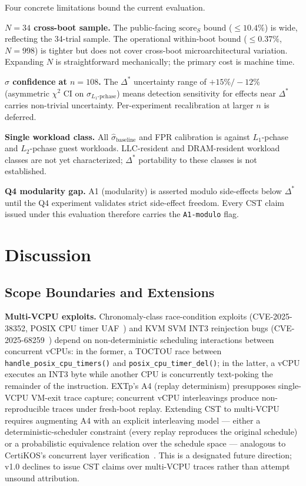 \documentclass[conference]{IEEEtran}
\newcommand{\sigbase}{\hat{\sigma}_\text{baseline}}
\newcommand{\Dstar}{\Delta^{*}}
\newcommand{\scoreS}{\text{score}_S}
\begin{document}
Four concrete limitations bound the current evaluation.

\textbf{$N{=}34$ cross-boot sample.} The public-facing $\scoreS$
bound ($\leq 10.4\%$) is wide, reflecting the 34-trial sample. The
operational within-boot bound ($\leq 0.37\%$, $N{=}998$) is tighter
but does not cover cross-boot microarchitectural variation.
Expanding $N$ is straightforward mechanically; the primary cost is
machine time.

\textbf{$\hat{\sigma}$ confidence at $n{=}108$.} The $\Dstar$
uncertainty range of $+15\%/{-}12\%$ (asymmetric $\chi^2$ CI on
$\hat{\sigma}_{L_1\text{-pchase}}$) means detection sensitivity for
effects near $\Dstar$ carries non-trivial uncertainty. Per-experiment
recalibration at larger $n$ is deferred.

\textbf{Single workload class.} All $\sigbase$ and FPR calibration
is against $L_1$-pchase and $L_2$-pchase guest workloads.
LLC-resident and DRAM-resident workload classes are not yet
characterized; $\Dstar$ portability to these classes is not
established.

\textbf{Q4 modularity gap.} A1 (modularity) is asserted modulo
side-effects below $\Dstar$ until the Q4 experiment validates strict
side-effect freedom. Every CST claim issued under this evaluation
therefore carries the \texttt{A1-modulo} flag.

\section{Discussion}\label{sec:discussion}

\subsection{Scope Boundaries and Extensions}\label{sec:discussion-scope}

\textbf{Multi-VCPU exploits.} Chronomaly-class race-condition
exploits (CVE-2025-38352, POSIX CPU timer
UAF~\cite{linuxkernel2025chronomaly}) and KVM SVM INT3 reinjection
bugs (CVE-2025-68259~\cite{linuxkernel2025int3reinject}) depend on
non-deterministic scheduling interactions between concurrent vCPUs:
in the former, a TOCTOU race between
\texttt{handle\_posix\_cpu\_timers()} and
\texttt{posix\_cpu\_timer\_del()}; in the latter, a vCPU executes
an INT3 byte while another CPU is concurrently text-poking the
remainder of the instruction. EXTp's A4 (replay determinism)
presupposes single-VCPU VM-exit trace capture; concurrent vCPU
interleavings produce non-reproducible traces under fresh-boot
replay. Extending CST to multi-VCPU requires augmenting A4 with an
explicit interleaving model --- either a deterministic-scheduler
constraint (every replay reproduces the original schedule) or a
probabilistic equivalence relation over the schedule space ---
analogous to CertiKOS's concurrent layer
verification~\cite{gu2016certikos}. This is a designated future
direction; v1.0 declines to issue CST claims over multi-VCPU
traces rather than attempt unsound attribution.
\end{document}
